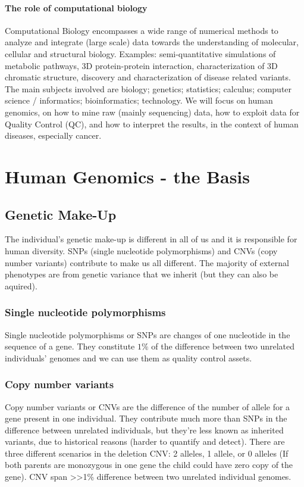 	\paragraph*{The role of computational biology}
	Computational Biology encompasses a wide range of numerical methods to analyze and integrate (large scale) data towards the understanding of molecular, cellular and structural biology. Examples: semi-quantitative simulations of metabolic pathways, 3D protein-protein interaction, characterization of 3D chromatic structure, discovery and characterization of disease related variants. The main subjects involved are biology; genetics; statistics; calculus; computer science / informatics; bioinformatics; technology.
We will focus on human genomics, on how to mine raw (mainly sequencing) data, how to exploit data for Quality Control (QC), and how to interpret the results, in the context of human diseases, especially cancer.

\section{Human Genomics - the Basis}
\subsection{Genetic Make-Up}
The individual's genetic make-up is different in all of us and it is responsible for human diversity.
SNPs (single nucleotide polymorphisms) and CNVs (copy number variants) contribute to make us all different.
The majority of external phenotypes are from genetic variance that we inherit (but they can also be aquired).

		\subsubsection{Single nucleotide polymorphisms}
		Single nucleotide polymorphisms or SNPs are changes of one nucleotide in the sequence of a gene.
		They constitute $1\%$ of the difference between two unrelated individuals' genomes and we can use them as quality control assets.

		\subsubsection{Copy number variants}
		Copy number variants or CNVs are the difference of the number of allele for a gene present in one individual.
		They contribute much more than SNPs in the difference between unrelated individuals, but they're less known as inherited variants, due to historical reasons (harder to quantify and detect).
		There are three different scenarios in the deletion CNV: 2 alleles, 1 allele, or 0 alleles (If both parents are monozygous in one gene the child could have zero copy of the gene).
		CNV span >>1\% difference between two unrelated individual genomes.

